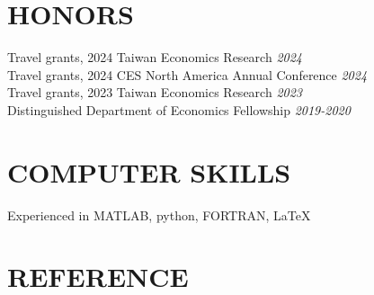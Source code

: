 \documentclass[10pt]{res} %
\begin{document}
\begin{resume}
\section{HONORS}
Travel grants, 2024 Taiwan Economics Research \hfill \textit{2024} \\
Travel grants, 2024 CES North America Annual Conference \hfill \textit{2024} \\
Travel grants, 2023 Taiwan Economics Research \hfill \textit{2023} \\
Distinguished Department of Economics Fellowship \hfill  \textit{2019-2020} \\

\vspace{-10pt}

\section{COMPUTER SKILLS}

Experienced in MATLAB, python, FORTRAN, \LaTeX{}

\section{REFERENCE}

\vspace{10pt}


\end{resume}
\end{document}
